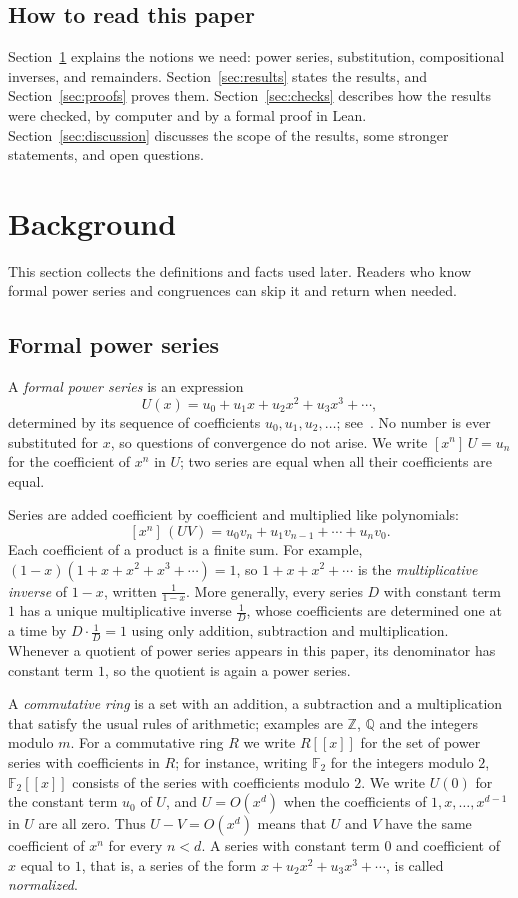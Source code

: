 \documentclass[11pt,a4paper]{article}
\theoremstyle{definition}
\theoremstyle{remark}
\newcommand{\Z}{\mathbb{Z}}
\newcommand{\Q}{\mathbb{Q}}
\newcommand{\F}{\mathbb{F}}
\newcommand{\ps}[1]{#1[[x]]}
\newcommand{\coeff}[2]{[x^{#1}]\,#2}
\begin{document}
\subsection{How to read this paper}
Section~\ref{sec:background} explains the notions we need: power series, substitution, compositional inverses, and
remainders. Section~\ref{sec:results} states the results, and Section~\ref{sec:proofs} proves them.
Section~\ref{sec:checks} describes how the results were checked, by computer and by a formal proof in Lean.
Section~\ref{sec:discussion} discusses the scope of the results, some stronger statements, and open questions.
\section{Background}\label{sec:background}
This section collects the definitions and facts used later. Readers who know formal power series and congruences can skip it and return when needed.
\subsection{Formal power series}
A \emph{formal power series} is an expression
\[
U(x)=u_0+u_1x+u_2x^2+u_3x^3+\cdots ,
\]
determined by its sequence of coefficients $u_0,u_1,u_2,\dots$; see~\cite{niven,stanley}. No number is ever
substituted for $x$, so questions of convergence do not arise. We write $\coeff{n}{U}=u_n$ for the coefficient of $x^n$ in $U$; two series are equal
when all their coefficients are equal.

Series are added coefficient by coefficient and multiplied like polynomials:
\[
\coeff{n}{(UV)}=u_0v_n+u_1v_{n-1}+\cdots+u_nv_0 .
\]
Each coefficient of a product is a finite sum. For example, $(1-x)(1+x+x^2+x^3+\cdots)=1$, so $1+x+x^2+\cdots$ is
the \emph{multiplicative inverse} of $1-x$, written $\frac{1}{1-x}$. More generally, every series $D$ with constant term
$1$ has a unique multiplicative inverse $\frac1D$, whose coefficients are determined one at a time by $D\cdot\frac1D=1$
using only addition, subtraction and multiplication. Whenever a quotient of power series appears in this paper, its
denominator has constant term $1$, so the quotient is again a power series.

A \emph{commutative ring} is a set with an addition, a subtraction and a multiplication that satisfy the usual rules
of arithmetic; examples are $\Z$, $\Q$ and the integers modulo $m$. For a commutative ring $R$ we write $\ps{R}$ for
the set of power series with coefficients in $R$; for instance, writing $\F_2$ for the integers modulo $2$, $\ps{\F_2}$
consists of the series with coefficients modulo $2$. We write
$U(0)$ for the constant term $u_0$ of $U$, and $U=O(x^d)$ when the coefficients of $1,x,\dots,x^{d-1}$ in $U$ are all
zero. Thus $U-V=O(x^d)$ means that $U$ and $V$ have the same coefficient of $x^n$ for every $n<d$. A series with
constant term $0$ and coefficient of $x$ equal to $1$, that is, a series of the form $x+u_2x^2+u_3x^3+\cdots$, is
called \emph{normalized}.
\end{document}
